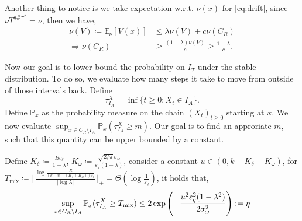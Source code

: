 \documentclass{article}
\begin{document}
Another thing to notice is we take expectation w.r.t. $\nu(x)$ for \cref{eq:drift}, since $\nu T^{q\#\pi^*}=\nu$, then we have,
\begin{equation}\label{eq:nu(C_R)isO_1}
    \begin{aligned}
        \nu(V)\coloneqq \mathbb E_{\nu}[V(x)]&\leq \lambda \nu(V)+c\nu(C_R)\\
\Rightarrow \nu(C_R)&\geq \frac{(1-\lambda)\nu(V)}{c}\geq \frac{1-\lambda}{c}.
    \end{aligned}
\end{equation}


Now our goal is to lower bound the probability on $I_{T}$ under the stable distribution. To do so,  we evaluate how many steps it take to move from outside of those intervals back. 
Define
\begin{equation*}
    \tau_{I_A}^X=\inf\{t\geq0:X_t\in I_A\}.
\end{equation*}
Define $\mathbb P_x$ as the probability measure on the chain $(X_t)_{t\geq 0}$ starting at $x$. We now evaluate $\sup_{x\in C_R\setminus I_A}\mathbb P_x(\tau^X_{I_A}\geq m)$. Our goal is to find an approriate $m$, such that this quantity can be upper bounded by a constant.

\begin{claim}
Define $K_\delta\coloneqq \frac{Bc_\delta}{1-\lambda}$,
$K_\omega\coloneqq \frac{\sqrt{2/\pi}\,\sigma_\omega}{\varepsilon_q(1-\lambda)}$,
consider a constant $u\in (0, k-K_{\delta}-K_\omega)$,
for $T_{\text{mix}}\coloneqq \lfloor \frac{\log\frac{R}{(k-u-(K_\delta+K_\omega))\varepsilon_q}}{|\log \lambda|} \rfloor_+=\Theta\left(\log\frac{1}{\varepsilon_q}\right)$,
it holds that,
    \begin{equation}\label{eq:returnning_prob_upper_bound}
        \sup_{x\in C_R\setminus I_A}\mathbb P_x(\tau_{I_A}^X \geq T_{\textnormal{mix}})
        \leq 2\exp\left(-\frac{u^2\varepsilon_q^2(1-\lambda^2)}{2\sigma_\omega^2}\right)
        :=\eta
    \end{equation}
\end{claim}
\end{document}
